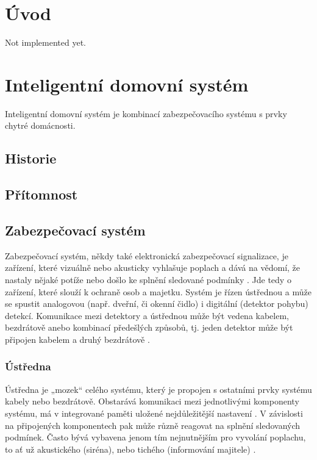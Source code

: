 \documentclass[FM,DP]{tulthesis}  %
\begin{document}

\chapter{Úvod}
Not implemented yet.


\chapter{Inteligentní domovní systém}
Inteligentní domovní systém je kombinací zabezpečovacího systému s prvky chytré domácnosti.

\section{Historie}

\section{Přítomnost}


\section{Zabezpečovací systém}
Zabezpečovací systém, někdy také elektronická zabezpečovací signalizace, je zařízení, které vizuálně nebo akusticky vyhlašuje poplach a dává na vědomí, že nastaly nějaké potíže nebo došlo ke splnění sledované podmínky \cite{Security alarm}. Jde tedy o zařízení, které slouží k ochraně osob a majetku. Systém je řízen ústřednou a může se spustit analogovou (např. dveřní, či okenní čidlo) i digitální (detektor pohybu) detekcí. Komunikace mezi detektory a ústřednou může být vedena kabelem, bezdrátově anebo kombinací předešlých způsobů, tj. jeden detektor může být připojen kabelem a druhý bezdrátově \cite{Electronic security system}.

\subsection{Ústředna}
Ústředna je „mozek“ celého systému, který je propojen s ostatními prvky systému kabely nebo bezdrátově. Obstarává komunikaci mezi jednotlivými komponenty systému, má v integrované paměti uložené nejdůležitější nastavení \cite{Electronic security system}. V závislosti na připojených komponentech pak může různě reagovat na splnění sledovaných podmínek. Často bývá vybavena jenom tím nejnutnějším pro vyvolání poplachu, to ať už akustického (siréna), nebo tichého (informování majitele) \cite{Security alarm}.
\end{document}
